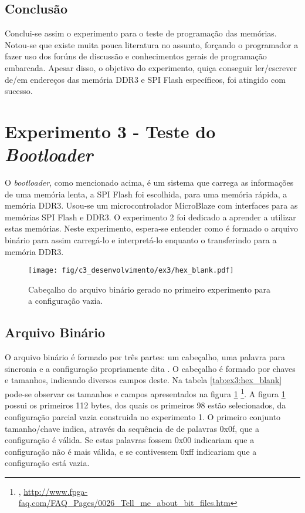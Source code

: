 \documentclass[11pt,a4paper,oneside]{book}
\begin{document}
\subsection{Conclusão}
Conclui-se assim o experimento para o teste de programação das memórias.
Notou-se que existe muita pouca literatura no assunto, forçando o programador a fazer uso dos forúns de discussão e conhecimentos gerais de programação embarcada.
Apesar disso, o objetivo do experimento, quiça conseguir ler/escrever de/em endereços das memória DDR3 e SPI Flash específicos, foi atingido com sucesso.

\section{Experimento 3 - Teste do \textit{Bootloader}}
O \textit{bootloader}, como mencionado acima, é um sistema que carrega as informações de uma memória lenta, a SPI Flash foi escolhida, para uma memória rápida, a memória DDR3.
Usou-se um microcontrolador MicroBlaze com interfaces para as memórias SPI Flash e DDR3.
O experimento 2 foi dedicado a aprender a utilizar estas memórias.
Neste experimento, espera-se entender como é formado o arquivo binário para assim carregá-lo e interpretá-lo enquanto o transferindo para a memória DDR3.

\begin{figure}[htp]
\centering
\texttt{[image: fig/c3\_desenvolvimento/ex3/hex\_blank.pdf]}
\caption{Cabeçalho do arquivo binário gerado no primeiro experimento para a configuração vazia.}
\label{fig:ex3:hex_blank}
\end{figure}

\subsection{Arquivo Binário}
O arquivo binário é formado por três partes: um cabeçalho, uma palavra para sincronia e a configuração propriamente dita \cite{ug470, xapp583}.
O cabeçalho é formado por chaves e tamanhos, indicando diversos campos deste.
Na tabela \ref{tab:ex3:hex_blank} pode-se observar os tamanhos e campos apresentados na figura \ref{fig:ex3:hex_blank} \footnote{, \url{http://www.fpga-faq.com/FAQ_Pages/0026_Tell_me_about_bit_files.htm}}.
A figura \ref{fig:ex3:hex_blank} possui os primeiros 112 bytes, dos quais os primeiros 98 estão selecionados, da configuração parcial vazia construida no experimento 1.
O primeiro conjunto tamanho/chave indica, através da sequência de de palavras 0x0f, que a configuração é válida.
Se estas palavras fossem 0x00 indicariam que a configuração não é mais válida, e se contivessem 0xff indicariam que a configuração está vazia.
\end{document}
